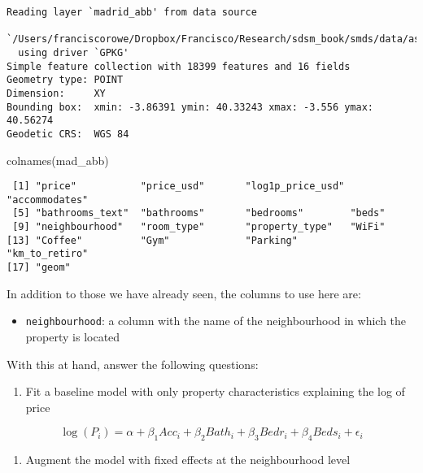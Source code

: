 \documentclass[
  letterpaper,
  krantz2]{style/krantz}
\newenvironment{Shaded}{\begin{snugshade}}{\end{snugshade}}
\newcommand{\FunctionTok}[1]{\textcolor[rgb]{0.28,0.35,0.67}{#1}}
\newcommand{\NormalTok}[1]{\textcolor[rgb]{0.00,0.23,0.31}{#1}}
\providecommand{\tightlist}{%
  \setlength{\itemsep}{0pt}\setlength{\parskip}{0pt}}\usepackage{longtable,booktabs,array}
\begin{document}
\begin{verbatim}
Reading layer `madrid_abb' from data source 
  `/Users/franciscorowe/Dropbox/Francisco/Research/sdsm_book/smds/data/assignment_1_madrid/madrid_abb.gpkg' 
  using driver `GPKG'
Simple feature collection with 18399 features and 16 fields
Geometry type: POINT
Dimension:     XY
Bounding box:  xmin: -3.86391 ymin: 40.33243 xmax: -3.556 ymax: 40.56274
Geodetic CRS:  WGS 84
\end{verbatim}

\begin{Shaded}
\begin{Highlighting}[]
\FunctionTok{colnames}\NormalTok{(mad\_abb)}
\end{Highlighting}
\end{Shaded}

\begin{verbatim}
 [1] "price"           "price_usd"       "log1p_price_usd" "accommodates"   
 [5] "bathrooms_text"  "bathrooms"       "bedrooms"        "beds"           
 [9] "neighbourhood"   "room_type"       "property_type"   "WiFi"           
[13] "Coffee"          "Gym"             "Parking"         "km_to_retiro"   
[17] "geom"           
\end{verbatim}

In addition to those we have already seen, the columns to use here are:

\begin{itemize}
\tightlist
\item
  \texttt{neighbourhood}: a column with the name of the neighbourhood in
  which the property is located
\end{itemize}

With this at hand, answer the following questions:

\begin{enumerate}
\def\labelenumi{\arabic{enumi}.}
\tightlist
\item
  Fit a baseline model with only property characteristics explaining the
  log of price
\end{enumerate}

\[
\log(P_i) = \alpha + \beta_1 Acc_i + \beta_2 Bath_i + \beta_3 Bedr_i + \beta_4 Beds_i + \epsilon_i
\]

\begin{enumerate}
\def\labelenumi{\arabic{enumi}.}
\setcounter{enumi}{1}
\tightlist
\item
  Augment the model with fixed effects at the neighbourhood level
\end{enumerate}
\end{document}
